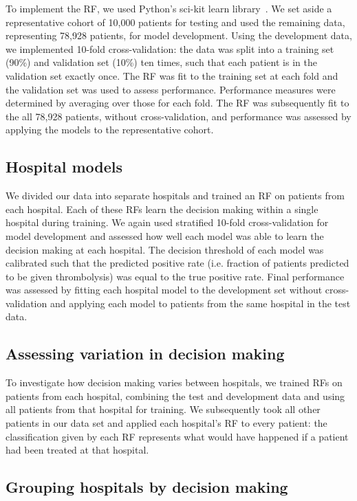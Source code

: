 \documentclass[12pt,a4paper, pdftex]{elsarticle}
\begin{document}
To implement the RF, we used Python's sci-kit learn library~\cite{pedregosa2011scikit}. We set aside a representative cohort of 10,000 patients for testing and used the remaining data, representing 78,928 patients, for model development. Using the development data, we implemented 10-fold cross-validation: the data was split into a training set (90\%) and validation set (10\%) ten times, such that each patient is in the validation set exactly once. The RF was fit to the training set at each fold and the validation set was used to assess performance. Performance measures were determined by averaging over those for each fold. The RF was subsequently fit to the all 78,928 patients, without cross-validation, and performance was assessed by applying the models to the representative cohort. 

\subsection{Hospital models}

We divided our data into separate hospitals and trained an RF on patients from each hospital. Each of these RFs learn the decision making within a single hospital during training. We again used stratified 10-fold cross-validation for model development and assessed how well each model was able to learn the decision making at each hospital. The decision threshold of each model was calibrated such that the predicted positive rate (i.e. fraction of patients predicted to be given thrombolysis) was equal to the true positive rate. Final performance was assessed by fitting each hospital model to the development set without cross-validation and applying each model to patients from the same hospital in the test data.


\subsection{Assessing variation in decision making}

To investigate how decision making varies between hospitals, we trained RFs on patients from each hospital, combining the test and development data and using all patients from that hospital for training. We subsequently took all other patients in our data set and applied each hospital's RF to every patient: the classification given by each RF represents what would have happened if a patient had been treated at that hospital.

\subsection{Grouping hospitals by decision making}
\end{document}
